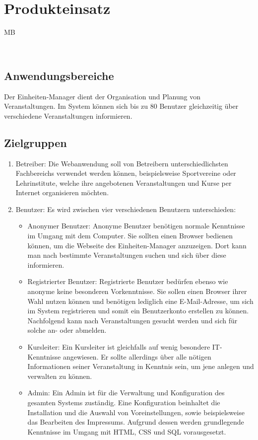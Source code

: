 \documentclass[a4paper]{scrreprt}
\begin{document}
  
\chapter{Produkteinsatz}
	\begin{tiny}
		MB
	\end{tiny}\\

    \section{Anwendungsbereiche}
		 Der \gls{Einheiten}-Manager dient der Organisation und Planung von Veranstaltungen. Im System können sich bis zu 80 Benutzer gleichzeitig über verschiedene Veranstaltungen informieren.   
     
	\section{Zielgruppen}
		 \begin{enumerate}
		 	\item Betreiber: Die Webanwendung soll von Betreibern unterschiedlichsten Fachbereichs verwendet werden können, beispielsweise Sportvereine oder Lehrinstitute, welche ihre angebotenen Veranstaltungen und Kurse per Internet organisieren möchten.
		 	\item Benutzer: Es wird zwischen vier verschiedenen Benutzern unterschieden:
		 	\begin{itemize}
		 		\item Anonymer Benutzer: Anonyme Benutzer benötigen normale Kenntnisse im Umgang mit dem Computer. Sie sollten einen \gls{Browser} bedienen können, um die Webseite des \gls{Einheiten}-Manager anzuzeigen. Dort kann man nach bestimmte Veranstaltungen suchen und sich über diese informieren.
		 		\item Registrierter Benutzer: Registrierte Benutzer bedürfen ebenso wie anonyme keine besonderen Vorkenntnisse. Sie sollen einen \gls{Browser} ihrer Wahl nutzen können und benötigen lediglich eine E-Mail-Adresse, um sich im System registrieren und somit ein Benutzerkonto erstellen zu können. Nachfolgend kann nach Veranstaltungen gesucht werden und sich für solche an- oder abmelden.
		 		\item Kursleiter: Ein Kursleiter ist gleichfalls auf wenig besondere IT-Kenntnisse angewiesen. Er sollte allerdings über alle nötigen Informationen seiner Veranstaltung in Kenntnis sein, um jene anlegen und verwalten zu können.
		 		\item \gls{Admin}: Ein \gls{Admin} ist für die Verwaltung und \gls{Konfiguration} des gesamten Systems zuständig. Eine Konfiguration beinhaltet die Installation und die Auswahl von Voreinstellungen, sowie beispielsweise das Bearbeiten des Impressums. Aufgrund dessen werden grundlegende Kenntnisse im Umgang mit HTML, CSS und SQL vorausgesetzt.
		 	\end{itemize}	
		 \end{enumerate}  
        
\end{document}
